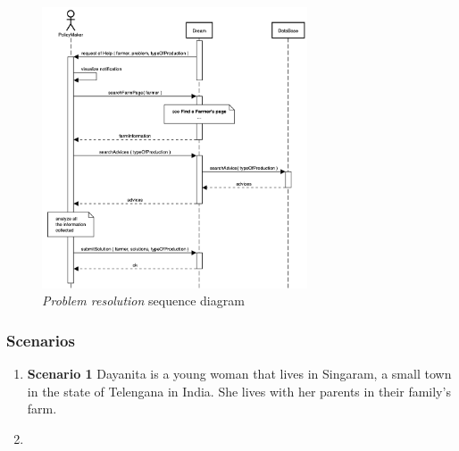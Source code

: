 \begin{enumerate}
\begin{figure}[H]
\begin{center}
        \includegraphics[width=0.7\textwidth]{sequence/replyHelp.png}
        \caption{\emph{Problem resolution} sequence diagram}
        \label{fig:sequence13}
        \end{center}
    \end{figure}
\end{enumerate}

\subsubsection{Scenarios}
\begin{enumerate}
    \item \textbf{Scenario 1}
    Dayanita is a young woman that lives in Singaram, a small town in the state of Telengana in India. 
    She lives with her parents in their family's farm.

    \item 
\end{enumerate}


